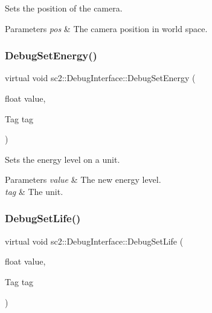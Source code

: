 Sets the position of the camera. 
\begin{DoxyParams}{Parameters}
{\em pos} & The camera position in world space. \\
\hline
\end{DoxyParams}
\mbox{\label{classsc2_1_1_debug_interface_a3049f5181825a014b8f05c75af8c254b}} 
\subsubsection{\texorpdfstring{Debug\+Set\+Energy()}{DebugSetEnergy()}}
{\footnotesize\ttfamily virtual void sc2\+::\+Debug\+Interface\+::\+Debug\+Set\+Energy (\begin{DoxyParamCaption}\item[{float}]{value,  }\item[{Tag}]{tag }\end{DoxyParamCaption})\hspace{0.3cm}{\ttfamily [pure virtual]}}

Sets the energy level on a unit. 
\begin{DoxyParams}{Parameters}
{\em value} & The new energy level. \\
\hline
{\em tag} & The unit. \\
\hline
\end{DoxyParams}
\mbox{\label{classsc2_1_1_debug_interface_aebec7aae013f15f2791dd17af6d9e320}} 
\subsubsection{\texorpdfstring{Debug\+Set\+Life()}{DebugSetLife()}}
{\footnotesize\ttfamily virtual void sc2\+::\+Debug\+Interface\+::\+Debug\+Set\+Life (\begin{DoxyParamCaption}\item[{float}]{value,  }\item[{Tag}]{tag }\end{DoxyParamCaption})\hspace{0.3cm}{\ttfamily [pure virtual]}}

